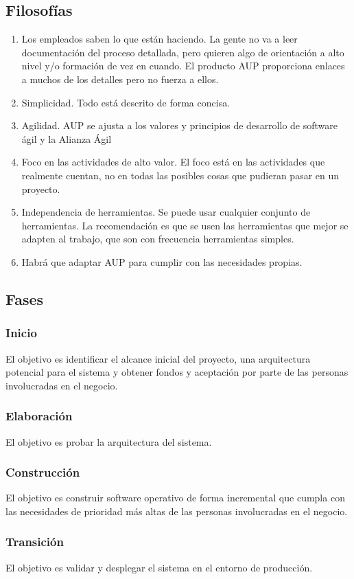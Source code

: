 \documentclass{article}
\begin{document}
	\subsection{Filosofías}
	\begin{enumerate}
		\item Los empleados saben lo que están haciendo. La gente no va a leer documentación del proceso detallada, pero quieren algo de orientación a alto nivel y/o formación de vez en cuando. El producto AUP proporciona enlaces a muchos de los detalles pero no fuerza a ellos. 
		\item Simplicidad. Todo está descrito de forma concisa. 
		\item Agilidad. AUP se ajusta a los valores y principios de desarrollo de software ágil y la Alianza Ágil 
		\item Foco en las actividades de alto valor. El foco está en las actividades que realmente cuentan, no en todas las posibles cosas que pudieran pasar en un proyecto. 
		\item Independencia de herramientas. Se puede usar cualquier conjunto de herramientas. La recomendación es que se usen las herramientas que mejor se adapten al trabajo, que son con frecuencia herramientas simples. 
		\item Habrá que adaptar AUP para cumplir con las necesidades propias.
	\end{enumerate}
	\subsection{Fases}
	\subsubsection{Inicio}
	El objetivo es identificar el alcance inicial del proyecto, una arquitectura potencial para el sistema y obtener fondos y aceptación por parte de las personas involucradas en el negocio. 
	\subsubsection{Elaboración}
	El objetivo es probar la arquitectura del sistema. 
	\subsubsection{Construcción}
El objetivo es construir software operativo de forma incremental que cumpla con las necesidades de prioridad más altas de las personas involucradas en el negocio. 
\subsubsection{Transición}
El objetivo es validar y desplegar el sistema en el entorno de producción.
\end{document}
